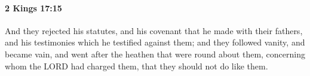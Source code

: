 
		\paragraph{2 Kings 17:15} %
			\label{2KINGS-17-15}

			And they rejected his statutes, and his covenant that he made with their fathers, and his testimonies which he testified against them; and they followed vanity, and became vain, and went after the heathen that were round about them, concerning whom the LORD had charged them, that they should not do like them.


